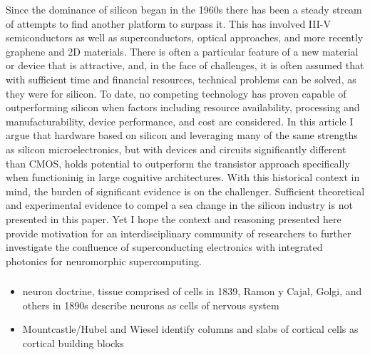 Since the dominance of silicon began in the 1960s there has been a steady stream of attempts to find another platform to surpass it. This has involved III-V semiconductors as well as superconductors, optical approaches, and more recently graphene and 2D materials. There is often a particular feature of a new material or device that is attractive, and, in the face of challenges, it is often assumed that with sufficient time and financial resources, technical problems can be solved, as they were for silicon. To date, no competing technology has proven capable of outperforming silicon when factors including resource availability, processing and manufacturability, device performance, and cost are considered. In this article I argue that hardware based on silicon and leveraging many of the same strengths as silicon microelectronics, but with devices and circuits significantly different than CMOS, holds potential to outperform the transistor approach specifically when functioninig in large cognitive architectures. With this historical context in mind, the burden of significant evidence is on the challenger. Sufficient theoretical and experimental evidence to compel a sea change in the silicon industry is not presented in this paper. Yet I hope the context and reasoning presented here provide motivation for an interdisciplinary community of researchers to further investigate the confluence of superconducting electronics with integrated photonics for neuromorphic supercomputing.

\subsubsection{\label{sec:neuroscience_history}}
\begin{itemize}
\item neuron doctrine, tissue comprised of cells in 1839, Ramon y Cajal, Golgi, and others in 1890s describe neurons as cells of nervous system
\item Mountcastle/Hubel and Wiesel identify columns and slabs of cortical cells as cortical building blocks
\end{itemize}

\cite{heza2004}